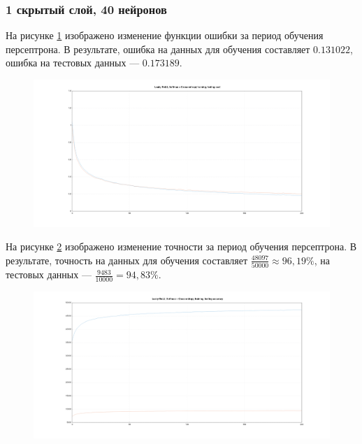 \documentclass[a4paper, 14pt]{extarticle}
\begin{document}
\subsubsection{1 скрытый слой, 40 нейронов}


На рисунке \ref{fig:1_40_leaky_relu_softmax_cross_entropy_cost} изображено изменение функции ошибки за период обучения персептрона.
В результате, ошибка на данных для обучения составляет $0.131022$, ошибка на тестовых данных --- $0.173189$.

\begin{figure}[!htb]
  \centering\includegraphics[width=\textwidth]{images/1_40_leaky_relu_softmax_cross_entropy_cost.png}
  \caption{}
  \label{fig:1_40_leaky_relu_softmax_cross_entropy_cost}
\end{figure}

На рисунке \ref{fig:1_40_leaky_relu_softmax_cross_entropy_accuracy} изображено изменение точности за период обучения персептрона.
В результате, точность на данных для обучения составляет $\frac{48097}{50000} \approx 96,19\%$, на тестовых данных --- $\frac{9483}{10000} = 94,83\%$.

\begin{figure}[!htb]
  \centering\includegraphics[width=\textwidth]{images/1_40_leaky_relu_softmax_cross_entropy_accuracy.png}
  \caption{}
  \label{fig:1_40_leaky_relu_softmax_cross_entropy_accuracy}
\end{figure}
\end{document}
